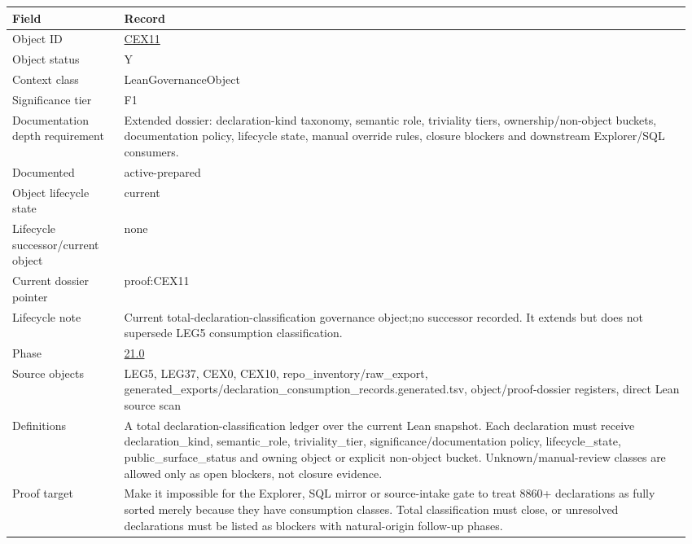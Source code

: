 \begin{longtable}{L{0.16\linewidth} L{0.81\linewidth}}
\hline
\textbf{Field} & \textbf{Record}\\
\hline
Object ID & \hyperlink{object-row-CEX11}{CEX11}\\
\hline\addlinespace[0.20em]
Object status & Y\\
\hline\addlinespace[0.20em]
Context class & LeanGovernanceObject\\
\hline\addlinespace[0.20em]
Significance tier & F1\\
\hline\addlinespace[0.20em]
Documentation depth requirement & Extended dossier: declaration-kind taxonomy, semantic role, triviality tiers, ownership/\allowbreak{}non-object buckets, documentation policy, lifecycle state, manual override rules, closure blockers and downstream Explorer/\allowbreak{}SQL consumers.\\
\hline\addlinespace[0.20em]
Documented & active-prepared\\
\hline\addlinespace[0.20em]
Object lifecycle state & current\\
\hline\addlinespace[0.20em]
Lifecycle successor/\allowbreak{}current object & none\\
\hline\addlinespace[0.20em]
Current dossier pointer & proof:CEX11\\
\hline\addlinespace[0.20em]
Lifecycle note & Current total-declaration-classification governance object;\newline no successor recorded. It extends but does not supersede LEG5 consumption classification.\\
\hline\addlinespace[0.20em]
Phase & \hyperlink{phase-row-21-0}{21.0}\\
\hline\addlinespace[0.20em]
Source objects & LEG5, LEG37, CEX0, CEX10, repo\_inventory/\allowbreak{}raw\_export, generated\_exports/\allowbreak{}declaration\_consumption\_records.generated.tsv, object/\allowbreak{}proof-dossier registers, direct Lean source scan\\
\hline\addlinespace[0.20em]
Definitions & A total declaration-classification ledger over the current Lean snapshot. Each declaration must receive declaration\_kind, semantic\_role, triviality\_tier, significance/\allowbreak{}documentation policy, lifecycle\_state, public\_surface\_status and owning object or explicit non-object bucket. Unknown/\allowbreak{}manual-review classes are allowed only as open blockers, not closure evidence.\\
\hline\addlinespace[0.20em]
Proof target & Make it impossible for the Explorer, SQL mirror or source-intake gate to treat 8860+ declarations as fully sorted merely because they have consumption classes. Total classification must close, or unresolved declarations must be listed as blockers with natural-origin follow-up phases.\\

\end{longtable}
